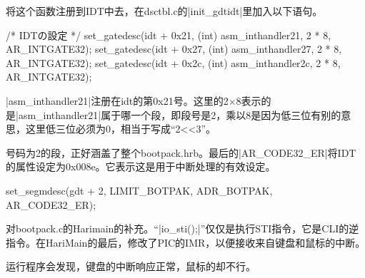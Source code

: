 \cs

将这个函数注册到IDT中去，在dsctbl.c的|init_gdtidt|里加入以下语句。

\begin{code}
    /* IDTの設定 */
	set_gatedesc(idt + 0x21, (int) asm_inthandler21, 2 * 8, AR_INTGATE32);
	set_gatedesc(idt + 0x27, (int) asm_inthandler27, 2 * 8, AR_INTGATE32);
	set_gatedesc(idt + 0x2c, (int) asm_inthandler2c, 2 * 8, AR_INTGATE32);
\end{code}

|asm_inthandler21|注册在idt的第0x21号。这里的2$\times$8表示的是|asm_inthandler21|属于哪一个段，即段号是2，乘以8是因为低三位有别的意思，这里低三位必须为0，相当于写成“2<<3”。

号码为2的段，正好涵盖了整个bootpack.hrb。最后的|AR_CODE32_ER|将IDT的属性设定为0x008e。它表示这是用于中断处理的有效设定。
\begin{code}
set_segmdesc(gdt + 2, LIMIT_BOTPAK, ADR_BOTPAK, AR_CODE32_ER);
\end{code}

\cs

对bootpack.c的Harimain的补充。“|io_sti();|”仅仅是执行STI指令，它是CLI的逆指令。在HariMain的最后，修改了PIC的IMR，以便接收来自键盘和鼠标的中断。

\cs

运行程序会发现，键盘的中断响应正常，鼠标的却不行。










